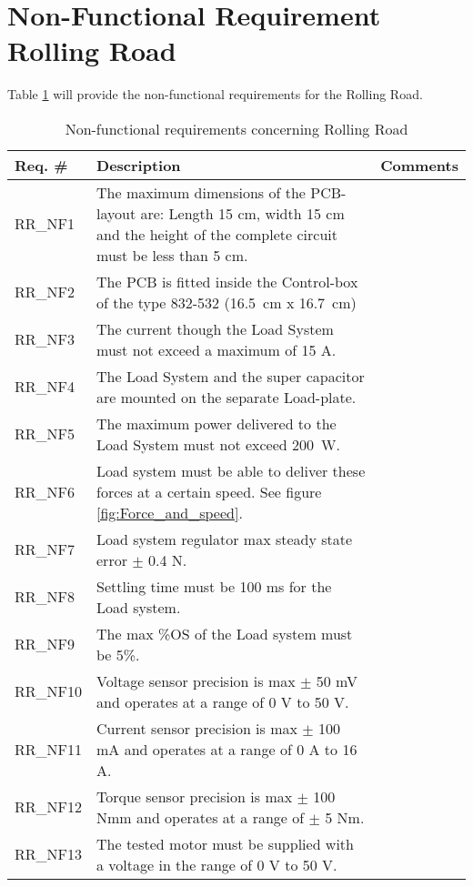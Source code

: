 \section{Non-Functional Requirement Rolling Road}
Table \ref{NFREQ_RR} will provide the non-functional requirements for the Rolling Road.

\begin{table}[h!]
	\label{NFREQ_RR}
	\centering
	\begin{tabular}{|p{2 cm}|p{10 cm}|p{2 cm}|}
		\hline
		\textbf{Req. \#} & \textbf{Description} & \textbf{Comments} \\\hline
		RR\_NF1
		& The maximum dimensions of the PCB-layout are: Length 15 cm, width 15 cm and the height of the complete circuit must be less than 5 cm. 
		&  \\ \hline
		RR\_NF2
		& The PCB is fitted inside the Control-box of the type 832-532 (\SI{16.5}{\centi \meter} x \SI{16.7}{\centi \meter})
		& \\ \hline
		RR\_NF3
		& The current though the Load System must not exceed a maximum of 15 A.
		& \\ \hline
		RR\_NF4
		& The Load System and the super capacitor are mounted on the separate Load-plate.
		& \\ \hline
		RR\_NF5
		& The maximum power delivered to the Load System must not exceed \SI{200}{\watt}.
		& \\ \hline
		RR\_NF6 
		& Load system must be able to deliver these forces at a certain speed. See figure \vref{fig:Force_and_speed}.
		& \\ \hline
		RR\_NF7
		& Load system regulator max steady state error $\pm$ 0.4 N. 
		& \\ \hline
		RR\_NF8
		& Settling time must be 100 ms for the Load system. 
		&  \\ \hline
		RR\_NF9
		&  The max \%OS of the Load system must be 5\%. 
		&  \\ \hline
		RR\_NF10
		& Voltage sensor precision is max $\pm$ 50 mV and operates at a range of 0 V to 50 V. 
		&  \\ \hline
		RR\_NF11
		& Current sensor precision is max $\pm$ 100 mA and operates at a range of 0 A to 16 A. 
		&  \\ \hline
		RR\_NF12
		& Torque sensor precision is max $\pm$ 100 Nmm and operates at a range of $\pm$ 5 Nm. 
		&  \\ \hline
		RR\_NF13
		& The tested motor must be supplied with a voltage in the range of 0 V to 50 V. 
		&  \\ \hline
	\end{tabular}
	\caption{Non-functional requirements concerning Rolling Road}
\end{table}

